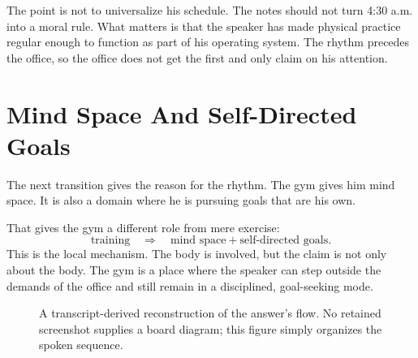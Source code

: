 The point is not to universalize his schedule. The notes should not turn 4:30 a.m. into a moral rule. What matters is that the speaker has made physical practice regular enough to function as part of his operating system. The rhythm precedes the office, so the office does not get the first and only claim on his attention.

\section{Mind Space And Self-Directed Goals}

The next transition gives the reason for the rhythm. The gym gives him mind space. It is also a domain where he is pursuing goals that are his own.

That gives the gym a different role from mere exercise:
\begin{equation}
\text{training}
\quad \Longrightarrow \quad
\text{mind space}
+
\text{self-directed goals}.
\end{equation}
This is the local mechanism. The body is involved, but the claim is not only about the body. The gym is a place where the speaker can step outside the demands of the office and still remain in a disciplined, goal-seeking mode.

\begin{figure}
\centering
{}
\caption{A transcript-derived reconstruction of the answer's flow. No retained screenshot supplies a board diagram; this figure simply organizes the spoken sequence.}
\end{figure}

